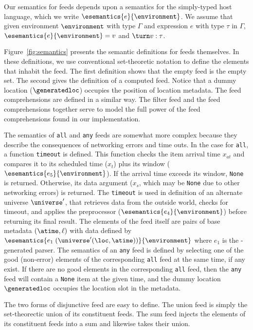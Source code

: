 Our semantics for feeds depends upon a semantics for the simply-typed
host language, which we write $\esemantics{e}{\environment}$. We assume that
given environment $\environment$ with type $\Gamma$ 
and expression $e$ with type $\tau$ in $\Gamma$, 
$\esemantics{e}{\environment} = v$
and $\turn v : \tau$.

Figure~\ref{fig:semantics} presents the semantic definitions for feeds themselves.  In these definitions,
we use conventional set-theoretic notation to define the elements
that inhabit the feed.
The first definition shows that the empty feed is the empty set. The
second gives the definition of a computed feed.  Notice that a
dummy location ($\generatedloc$) occupies the position of location
metadata.  The feed comprehensions are defined in a similar way. 
The filter feed and the feed comprehensions together serve to model
the full power of the feed comprehensions found in our implementation.


The semantics of {\tt all} and {\tt any} feeds are somewhat more complex
because they describe the consequences of networking errors and time outs.
In the case for {\tt all}, a function {\tt timeout} is defined.  This
function checks the item arrival time $x_{at}$ and compares it to its
scheduled time ($x_t$) plus its window ($\esemantics{e_5}{\environment}$).  If
the arrival time exceeds its window, {\tt None} is returned. Otherwise,
its data argument ($x_s$, which may be {\tt None} due to other networking 
errors) is returned.  The {\tt timeout} is used in definition of an 
alternate universe $\universe'$, that retrieves data from the outside world,
checks for timeout, and applies the preprocessor 
($\esemantics{e_4}{\environment}$) before returning its final result.
The elements of the feed itself are pairs of base metadata $(\atime,\ell)$
with data defined by $\esemantics{e_1 \; (\universe'(\loc,\atime))}{\environment}$
where $e_1$ is the \pads{}-generated parser.
The semantics of an {\tt any} feed is defined by selecting one of the
good (non-error) elements of the corresponding {\tt all} feed at the same time,
if any exist.  If there are no good elements in 
 the corresponding {\tt all} feed, then the {\tt any} feed will contain a
{\tt None} item at the given time, and the dummy location $\generatedloc$
occupies the location slot in the metadata.

The two forms of disjunctive feed are easy to define.  The
union feed is simply the set-theorectic union of
its constituent feeds.  The sum feed injects the elements of its constituent
feeds into a sum and likewise takes their union.

